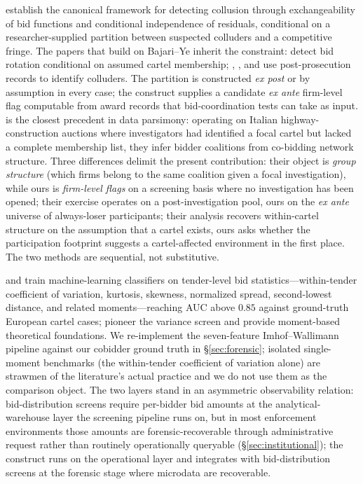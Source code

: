 \citet{bajari2003deciding} establish the canonical framework for
detecting collusion through exchangeability of bid functions and
conditional independence of residuals, conditional on a
researcher-supplied partition between suspected colluders and a
competitive fringe. The papers that build on Bajari--Ye inherit
the constraint:
\citet{porter1993detection,porter1999ohio} detect bid rotation
conditional on assumed cartel membership;
\citet{baldwin1997bidder}, \citet{clark2021collusion}, and
\citet{schurter2020identification} use post-prosecution records
to identify colluders. The partition is constructed
\emph{ex post} or by assumption in every case; the construct
supplies a candidate \emph{ex ante} firm-level flag computable
from award records that bid-coordination tests can take as input.
\citet{conley2016detecting} is the closest precedent in data
parsimony: operating on Italian highway-construction auctions
where investigators had identified a focal cartel but lacked a
complete membership list, they infer bidder coalitions from
co-bidding network structure. Three differences delimit the
present contribution: their object is \emph{group structure}
(which firms belong to the same coalition given a focal
investigation), while ours is \emph{firm-level flags} on a
screening basis where no investigation has been opened; their
exercise operates on a post-investigation pool, ours on the
\emph{ex ante} universe of always-loser participants; their
analysis recovers within-cartel structure on the assumption that
a cartel exists, ours asks whether the participation footprint
suggests a cartel-affected environment in the first place. The
two methods are sequential, not substitutive.

\citet{imhof2019detecting,imhof2018screening,huber2019machine}
and \citet{wallimann2023machine} train machine-learning
classifiers on tender-level bid statistics---within-tender
coefficient of variation, kurtosis, skewness, normalized
spread, second-lowest distance, and related
moments---reaching AUC above $0.85$ against ground-truth European
cartel cases; \citet{abrantesmetz2006a} pioneer the variance
screen and \citet{chassang2022robust} provide moment-based
theoretical foundations. We re-implement the seven-feature
Imhof--Wallimann pipeline against our cobidder ground truth in
\S\ref{sec:forensic}; isolated single-moment benchmarks (the
within-tender coefficient of variation alone) are strawmen of
the literature's actual practice and we do not use them as the
comparison object. The two layers stand in an asymmetric
observability relation: bid-distribution screens require
per-bidder bid amounts at the analytical-warehouse layer the
screening pipeline runs on, but in most enforcement environments
those amounts are forensic-recoverable through administrative
request rather than routinely operationally queryable
(\S\ref{sec:institutional}); the construct runs on the
operational layer and integrates with bid-distribution screens
at the forensic stage where microdata are recoverable.

